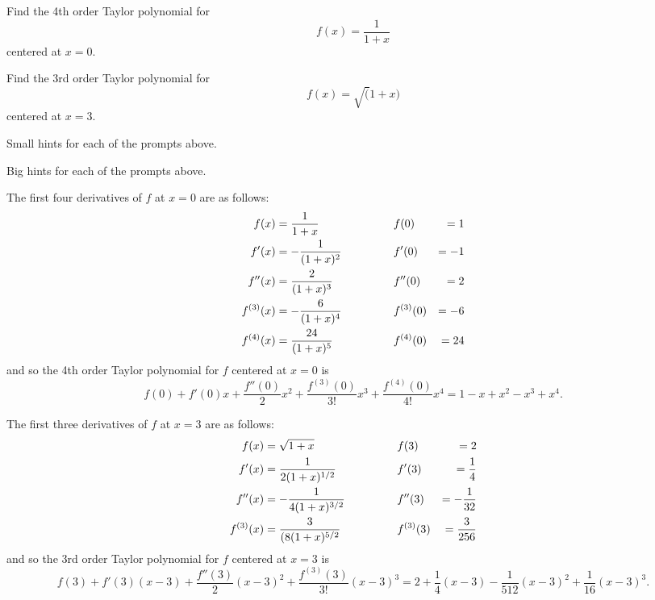 \begin{activity} \label{8.5.Act1}
\ba
\item Find the 4th order Taylor polynomial for
\[f(x) = \frac{1}{1+x}\]
centered at $x = 0$.

\item Find the 3rd order Taylor polynomial for
\[f(x) = \sqrt(1 + x)\]
 centered at $x = 3$.

 \ea


\end{activity}

\begin{smallhint}
\ba
	\item Small hints for each of the prompts above.
\ea
\end{smallhint}
\begin{bighint}
\ba
	\item Big hints for each of the prompts above.
\ea
\end{bighint}
\begin{activitySolution}
\ba
	\item The first four derivatives of $f$ at $x=0$ are as follows:
\begin{align*}
f(x) &= \frac{1}{1+x} & \hspace{0.5in} & f(0) &= 1 \\
f'(x) &= -\frac{1}{(1+x)^2} & \hspace{0.5in} & f'(0) &= -1 \\
f''(x) &= \frac{2}{(1+x)^3} & \hspace{0.5in} & f''(0) &= 2 \\
f^{(3)}(x) &= -\frac{6}{(1+x)^4} & \hspace{0.5in} & f^{(3)}(0) &= -6 \\
f^{(4)}(x) &= \frac{24}{(1+x)^5} & \hspace{0.5in} & f^{(4)}(0) &= 24 \\
\end{align*}
and so the 4th order Taylor polynomial for $f$ centered at $x=0$ is 
\[f(0) + f'(0)x + \frac{f''(0)}{2} x^2 + \frac{f^{(3)}(0)}{3!} x^3 + \frac{f^{(4)}(0)}{4!} x^4 = 1 - x + x^2 - x^3 + x^4.\]

\item The first three derivatives of $f$ at $x=3$ are as follows:
\begin{align*}
f(x) &= \sqrt{1+x} & \hspace{0.5in} & f(3) &= 2 \\
f'(x) &= \frac{1}{2(1+x)^{1/2}} & \hspace{0.5in} & f'(3) &= \frac{1}{4} \\
f''(x) &= -\frac{1}{4(1+x)^{3/2}} & \hspace{0.5in} & f''(3) &= -\frac{1}{32} \\
f^{(3)}(x) &= \frac{3}{(8(1+x)^{5/2}} & \hspace{0.5in} & f^{(3)}(3) &= \frac{3}{256} \\
\end{align*}
and so the 3rd order Taylor polynomial for $f$ centered at $x=3$ is
\[f(3) + f'(3)(x-3) + \frac{f''(3)}{2} (x-3)^2 + \frac{f^{(3)}(3)}{3!} (x-3)^3 = 2 + \frac{1}{4} (x-3) - \frac{1}{512} (x-3)^2 + \frac{1}{16} (x-3)^3.\]

\ea
\end{activitySolution}
\aftera 